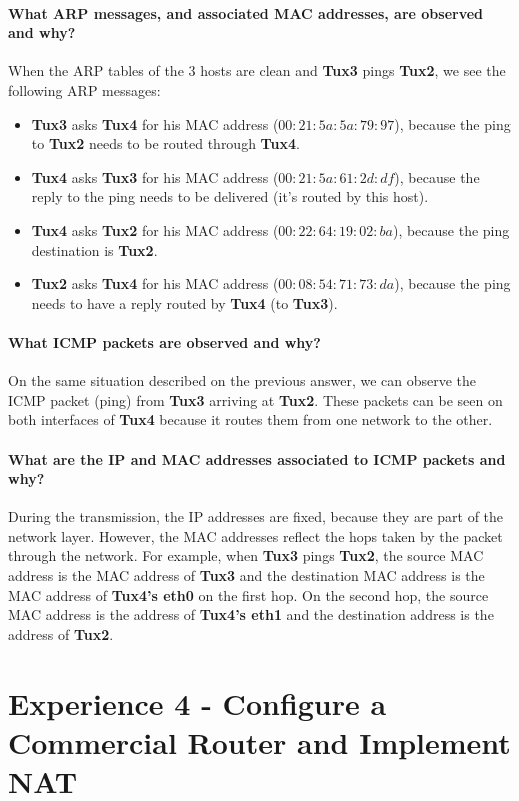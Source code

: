 \documentclass[11pt]{report}
\newcommand{\tux}[1]{\textbf{Tux#1}}
\begin{document}
\paragraph{What ARP messages, and associated MAC addresses, are observed and why?}
When the ARP tables of the 3 hosts are clean and \tux{3} pings \tux{2}, we see the
following ARP messages:
\begin{itemize}
  \item \tux{3} asks \tux{4} for his MAC address ($00:21:5a:5a:79:97$), because the
    ping to \tux{2} needs to be routed through \tux{4}.
  \item \tux{4} asks \tux{3} for his MAC address ($00:21:5a:61:2d:df$), because the
    reply to the ping needs to be delivered (it's routed by this host).
  \item \tux{4} asks \tux{2} for his MAC address ($00:22:64:19:02:ba$), because the
    ping destination is \tux{2}.
  \item \tux{2} asks \tux{4} for his MAC address ($00:08:54:71:73:da$), because the
    ping needs to have a reply routed by \tux{4} (to \tux{3}).
\end{itemize}

\paragraph{What ICMP packets are observed and why?}
On the same situation described on the previous answer, we can observe the ICMP packet
(ping) from \tux{3} arriving at \tux{2}. These packets can be seen on both interfaces
of \tux{4} because it routes them from one network to the other.

\paragraph{What are the IP and MAC addresses associated to ICMP packets and why?}
During the transmission, the IP addresses are fixed, because they are part of the
network layer. However, the MAC addresses reflect the hops taken by the packet
through the network. For example, when \tux{3} pings \tux{2}, the source MAC address
is the MAC address of \tux{3} and the destination MAC address is the MAC address
of \textbf{Tux4's eth0} on the first hop. On the second hop, the source MAC address
is the address of \textbf{Tux4's eth1} and the destination address is the address of
\tux{2}.

\section{Experience 4 - Configure a Commercial Router and Implement NAT}
\end{document}
